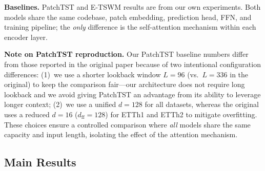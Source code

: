 \documentclass[conference]{IEEEtran}
\begin{document}
\textbf{Baselines.} PatchTST and E-TSWM results are from our own experiments. Both models share the same codebase, patch embedding, prediction head, FFN, and training pipeline; the \emph{only} difference is the self-attention mechanism within each encoder layer.

\textbf{Note on PatchTST reproduction.} Our PatchTST baseline numbers differ from those reported in the original paper \cite{b_patchtst} because of two intentional configuration differences: (1)~we use a shorter lookback window $L{=}96$ (vs.\ $L{=}336$ in the original) to keep the comparison fair---our architecture does not require long lookback and we avoid giving PatchTST an advantage from its ability to leverage longer context; (2)~we use a unified $d{=}128$ for all datasets, whereas the original uses a reduced $d{=}16$ ($d_\text{ff}{=}128$) for ETTh1 and ETTh2 to mitigate overfitting. These choices ensure a controlled comparison where \emph{all} models share the same capacity and input length, isolating the effect of the attention mechanism.

\subsection{Main Results}
\end{document}
